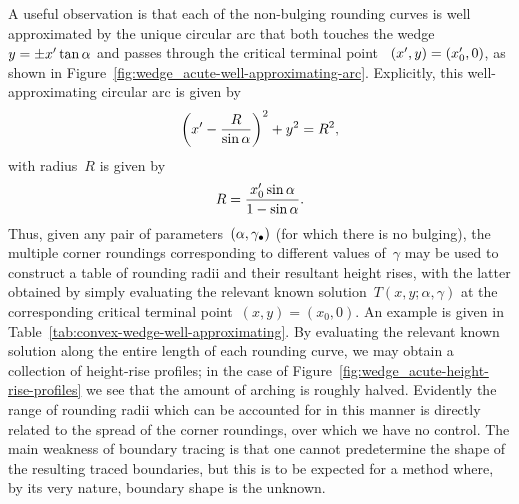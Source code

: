 A useful observation is that
each of the non-bulging rounding curves is well approximated
by the unique circular arc
that both touches the wedge~$y = \pm x' \tan\alpha$
and passes through the critical terminal point~%
  $(x', y) = (x'_0, 0)$,
as shown in Figure~\ref{fig:wedge_acute-well-approximating-arc}.
Explicitly, this well-approximating circular arc is given by
\begin{equation}
  \roundbr*{\offset{x} - \frac{R}{\sin\alpha}}^2 + y^2 = R^2,
  \label{eq:moderate-well-approximating-rounding-circle}
\end{equation}
with radius~$R$ is given by
\begin{equation}
  R = \frac{\offset{x}_0 \sin\alpha}{1 - \sin\alpha}.
  \label{eq:moderate-well-approximating-rounding-radius}
\end{equation}
Thus, given any pair of parameters~$(\alpha, \gamma_\bullet)$
(for which there is no bulging),
the multiple corner roundings corresponding to different values of~$\gamma$
may be used to construct a table of rounding radii
and their resultant height rises,
with the latter obtained by simply
evaluating the relevant known solution~$T (x, y; \alpha, \gamma)$
at the corresponding critical terminal point~$(x, y) = (x_0, 0)$.
An example is given in Table~\ref{tab:convex-wedge-well-approximating}.
By evaluating the relevant known solution
along the entire length of each rounding curve,
we may obtain a collection of height-rise profiles;
in the case of Figure~\ref{fig:wedge_acute-height-rise-profiles}
we see that the amount of arching is roughly halved.
Evidently the range of rounding radii
which can be accounted for in this manner
is directly related to the spread of the corner roundings,
over which we have no control.
The main weakness of boundary tracing is that
one cannot predetermine the shape of the resulting traced boundaries,
but this is to be expected for a method where,
by its very nature,
boundary shape is the unknown.

